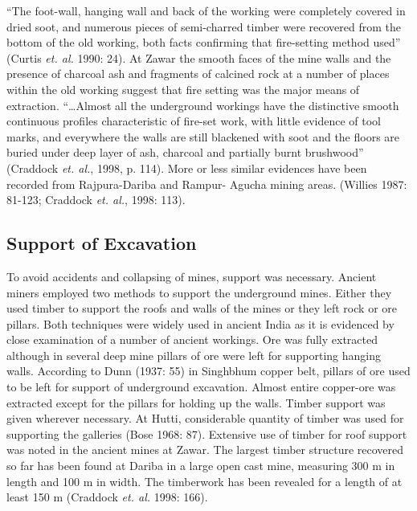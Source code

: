 “The foot-wall, hanging wall and back of the working were completely covered in dried soot, and numerous pieces of semi-charred timber were recovered from the bottom of the old working, both facts confirming that fire-setting method used” (Curtis {\it et. al.} 1990: 24). At Zawar the smooth faces of the mine walls and the presence of charcoal ash and fragments of calcined rock at a number of places within the old working suggest that fire setting was the major means of extraction. “…Almost all the underground workings have the distinctive smooth continuous profiles characteristic of fire-set work, with little evidence of tool marks, and everywhere the walls are still blackened with soot and the floors are buried under deep layer of ash, charcoal and partially burnt brushwood” (Craddock {\it et. al.}, 1998, p. 114). More or less similar evidences have been recorded from Rajpura-Dariba and Rampur- Agucha mining areas. (Willies 1987: 81-123; Craddock {\it et. al.}, 1998: 113).

\vspace{-.3cm}

\subsection*{Support of Excavation}

\vspace{-.2cm}

To avoid accidents and collapsing of mines, support was necessary. Ancient miners employed two methods to support the underground mines. Either they used timber to support the roofs and walls of the mines or they left rock or ore pillars. Both techniques were widely used in ancient India as it is evidenced by close examination of a number of ancient workings.  Ore was fully extracted although in several deep mine pillars of ore were left for supporting hanging walls. According to Dunn (1937: 55) in Singhbhum copper belt, pillars of ore used to be left for support of underground excavation. Almost entire copper-ore was extracted except for the pillars for holding up the walls. Timber support was given wherever necessary.  At Hutti, considerable quantity of timber was used for supporting the galleries (Bose 1968: 87).  Extensive use of timber for roof support was noted in the ancient mines at Zawar. The largest timber structure recovered so far has been found at Dariba in a large open cast mine, measuring 300 m in length and 100 m in width. The timberwork has been revealed for a length of at least 150 m (Craddock {\it et. al.} 1998: 166). 

